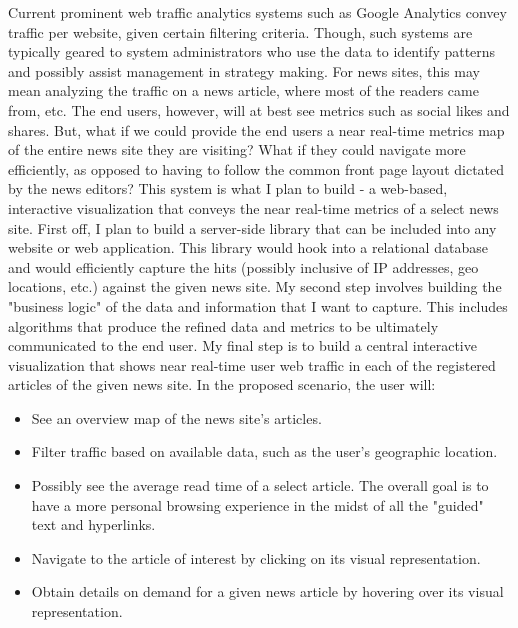 \documentclass[12pt]{article}
\begin{document}
Current prominent web traffic analytics systems such as Google Analytics convey traffic per website, given certain filtering criteria. Though, such systems are typically geared to system administrators who use the data to identify patterns and possibly assist management in strategy making. For news sites, this may mean analyzing the traffic on a news article, where most of the readers came from, etc. The end users, however, will at best see metrics such as social likes and shares. But, what if we could provide the end users a near real-time metrics map of the entire news site they are visiting? What if they could navigate more efficiently, as opposed to having to follow the common front page layout dictated by the news editors? This system is what I plan to build - a web-based, interactive visualization that conveys the near real-time metrics of a select news site.
First off, I plan to build a server-side library that can be included into any website or web application. This library would hook into a relational database and would efficiently capture the hits (possibly inclusive of IP addresses, geo locations, etc.) against the given news site.
My second step involves building the "business logic" of the data and information that I want to capture. This includes algorithms that produce the refined data and metrics to be ultimately communicated to the end user.
My final step is to build a central interactive visualization that shows near real-time user web traffic in each of the registered articles of the given news site. In the proposed scenario, the user will:
\begin{itemize}
\item See an overview map of the news site's articles.
\item Filter traffic based on available data, such as the user's geographic location.
\item Possibly see the average read time of a select article. The overall goal is to have a more personal browsing experience in the midst of all the "guided" text and hyperlinks.
\item Navigate to the article of interest by clicking on its visual representation.
\item Obtain details on demand for a given news article by hovering over its visual representation.
\end{itemize}
\end{document}
